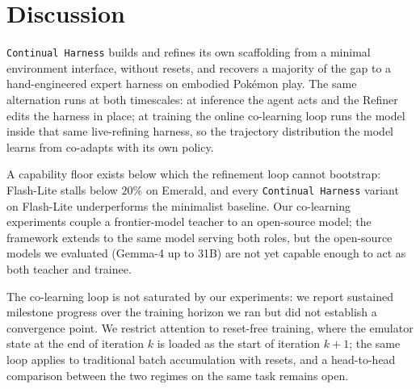 \section{Discussion}\label{sec:discussion}

\texttt{Continual Harness} builds and refines its own scaffolding from a minimal environment interface, without resets, and recovers a majority of the gap to a hand-engineered expert harness on embodied Pok\'{e}mon play. The same alternation runs at both timescales: at inference the agent acts and the Refiner edits the harness in place; at training the online co-learning loop runs the model inside that same live-refining harness, so the trajectory distribution the model learns from co-adapts with its own policy.

A capability floor exists below which the refinement loop cannot bootstrap: Flash-Lite stalls below $20\%$ on Emerald, and every \texttt{Continual Harness} variant on Flash-Lite underperforms the minimalist baseline. Our co-learning experiments couple a frontier-model teacher to an open-source model; the framework extends to the same model serving both roles, but the open-source models we evaluated (Gemma-4 up to 31B) are not yet capable enough to act as both teacher and trainee.

The co-learning loop is not saturated by our experiments: we report sustained milestone progress over the training horizon we ran but did not establish a convergence point. We restrict attention to reset-free training, where the emulator state at the end of iteration $k$ is loaded as the start of iteration $k{+}1$; the same loop applies to traditional batch accumulation with resets, and a head-to-head comparison between the two regimes on the same task remains open.